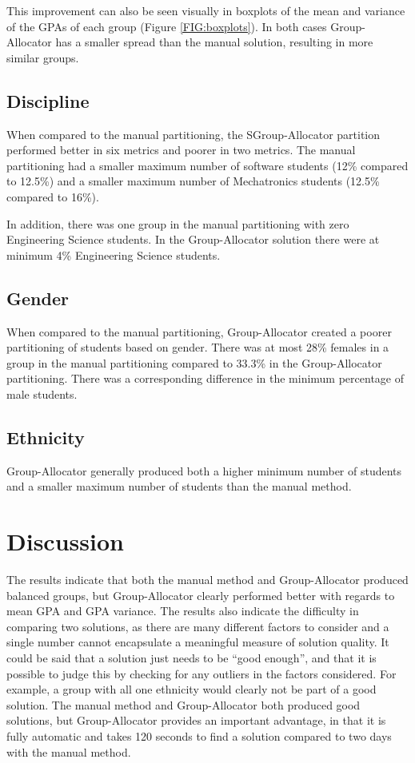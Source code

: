 \documentclass[12pt]{ORSNZ}
\begin{document}
This improvement can also be seen visually in boxplots of the mean and variance of the GPAs of each group (Figure \ref{FIG:boxplots}). In both cases Group-Allocator has a smaller spread than the manual solution, resulting in more similar groups.

\subsection{Discipline}
When compared to the manual partitioning, the SGroup-Allocator partition performed better in six metrics and poorer in two metrics. The manual partitioning had a smaller maximum number of software students (12\% compared to 12.5\%) and a smaller maximum number of Mechatronics students (12.5\% compared to 16\%). 

In addition, there was one group in the manual partitioning with zero Engineering Science students. In the Group-Allocator solution there were at minimum 4\% Engineering Science students.

\subsection{Gender}
When compared to the manual partitioning, Group-Allocator created a poorer partitioning of students based on gender. There was at most 28\% females in a group in the manual partitioning compared to 33.3\% in the Group-Allocator partitioning. There was a corresponding difference in the minimum percentage of male students.

\subsection{Ethnicity}

Group-Allocator generally produced both a higher minimum number of students and a smaller maximum number of students than the manual method.

\section{Discussion}
The results indicate that both the manual method and Group-Allocator produced balanced groups, but Group-Allocator clearly performed better with regards to mean GPA and GPA variance. The results also indicate the difficulty in comparing two solutions, as there are many different factors to consider and a single number cannot encapsulate a meaningful measure of solution quality. It could be said that a solution just needs to be ``good enough'', and that it is possible to judge this by checking for any outliers in the factors considered. For example, a group with all one ethnicity would clearly not be part of a good solution. The manual method and Group-Allocator both produced good solutions, but Group-Allocator provides an important advantage, in that it is fully automatic and takes 120 seconds to find a solution compared to two days with the manual method.
\end{document}
